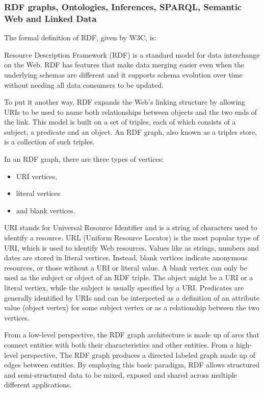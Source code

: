 \subsubsection{RDF graphs, Ontologies, Inferences, SPARQL, Semantic Web and Linked Data} \label{subsubsection:LiteratureReview/ReviewofGraphDatabaseSystems/Graphdatamodels/RDFgraphsOntologiesInferencesSPARQLSemanticWebandLinkedData}
The formal definition of RDF, given by W3C, is:
\begin{definition}[of RDF]\label{definition:ofRDF}
	Resource Description Framework (RDF) is a standard model for data interchange on the Web.
	RDF has features that make data merging easier even when the underlying schemas are different and it supports schema evolution over time without needing all data consumers to be updated.
\end{definition}

To put it another way, RDF expands the Web's linking structure by allowing URIs to be used to name both relationships between objects and the two ends of the link.
This model is built on a set of triples, each of which consists of a subject, a predicate and an object.
An RDF graph, also known as a triples store, is a collection of such triples.

In an RDF graph, there are three types of vertices:
 \begin{itemize}[noitemsep]
	\item URI vertices,
	\item literal vertices
	\item and blank vertices.
\end{itemize}

URI stands for Universal Resource Identifier and is a string of characters used to identify a resource.
URL (Uniform Resource Locator) is the most popular type of URI, which is used to identify Web resources.
Values like as strings, numbers and dates are stored in literal vertices.
Instead, blank vertices indicate anonymous resources, or those without a URI or literal value.
A blank vertex can only be used as the subject or object of an RDF triple.
The object might be a URI or a literal vertiex, while the subject is usually specified by a URI.
Predicates are generally identified by URIs and can be interpreted as a definition of an attribute value (object vertex) for some subject vertex or as a relationship between the two vertices.

From a low-level perspective, the RDF graph architecture is made up of arcs that connect entities with both their characteristics and other entities.
From a high-level perspective, The RDF graph produces a directed labeled graph made up of edges between entities.
By employing this basic paradigm, RDF allows structured and semi-structured data to be mixed, exposed and shared across multiple different applications. 

